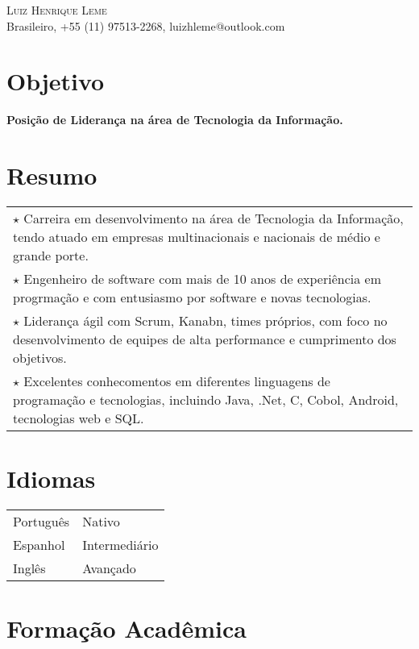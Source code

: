 \documentclass[a4paper, oneside, final]{scrartcl}
\newcommand{\vspc}{\vspace{0.15cm}} %
\begin{document}
\begin{center}
\textsc{\Huge{Luiz Henrique Leme}} \vspc\\
{\small Brasileiro, +55 (11) 97513-2268, luizhleme@outlook.com}

\section{Objetivo}
	{\large \bf Posição de Liderança na área de Tecnologia da Informação.}
	
\section{Resumo}

\begin{tabularx}{1\linewidth}{X}
	$\star$ Carreira em desenvolvimento na área de Tecnologia da Informação, tendo atuado em empresas multinacionais e nacionais de médio e grande porte. \vspc\\
	
	$\star$ Engenheiro de software com mais de 10 anos de experiência em progrmação e com entusiasmo por software e novas tecnologias. \vspc\\
	
	$\star$ Liderança ágil com Scrum, Kanabn, times próprios, com foco no desenvolvimento de equipes de alta performance e cumprimento dos objetivos. \vspc\\
	
	$\star$ Excelentes conhecomentos em diferentes linguagens de programação e tecnologias, incluindo Java, .Net, C, Cobol, Android, tecnologias web e SQL. \vspc\\	
\end{tabularx}


\section{Idiomas}

\begin{tabularx}{1\linewidth}{p{5cm}X}
Português  & Nativo \\
Espanhol   & Intermediário \\  
Inglês     & Avançado\\
\end{tabularx}

\section{Formação Acadêmica}


\end{center}
\end{document}
